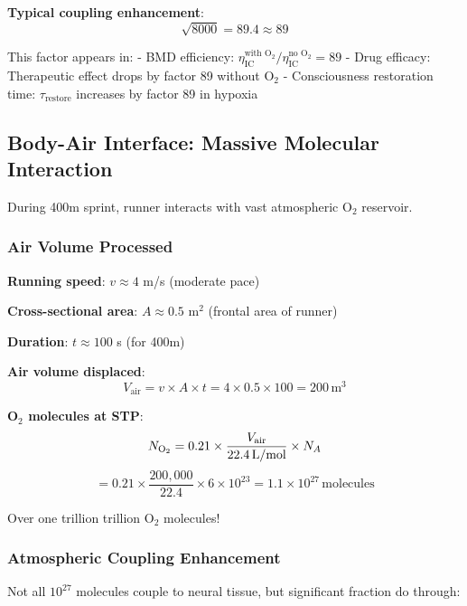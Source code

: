 \documentclass[11pt,onecolumn]{article}
\begin{document}
\textbf{Typical coupling enhancement}:
\begin{equation}
\sqrt{8000} = 89.4 \approx 89
\end{equation}

This factor appears in:
- BMD efficiency: $\eta_{\text{IC}}^{\text{with O}_2} / \eta_{\text{IC}}^{\text{no O}_2} = 89$
- Drug efficacy: Therapeutic effect drops by factor 89 without O$_2$
- Consciousness restoration time: $\tau_{\text{restore}}$ increases by factor 89 in hypoxia

\subsection{Body-Air Interface: Massive Molecular Interaction}

During 400m sprint, runner interacts with vast atmospheric O$_2$ reservoir.

\subsubsection{Air Volume Processed}

\textbf{Running speed}: $v \approx 4$ m/s (moderate pace)

\textbf{Cross-sectional area}: $A \approx 0.5$ m$^2$ (frontal area of runner)

\textbf{Duration}: $t \approx 100$ s (for 400m)

\textbf{Air volume displaced}:
\begin{equation}
V_{\text{air}} = v \times A \times t = 4 \times 0.5 \times 100 = 200\,\text{m}^3
\end{equation}

\textbf{O$_2$ molecules at STP}:
\begin{equation}
N_{\ce{O2}} = 0.21 \times \frac{V_{\text{air}}}{22.4\,\text{L/mol}} \times N_A
\end{equation}
\begin{equation}
= 0.21 \times \frac{200{,}000}{22.4} \times 6 \times 10^{23} = 1.1 \times 10^{27}\,\text{molecules}
\end{equation}

Over one trillion trillion O$_2$ molecules!

\subsubsection{Atmospheric Coupling Enhancement}

Not all $10^{27}$ molecules couple to neural tissue, but significant fraction do through:
\end{document}
